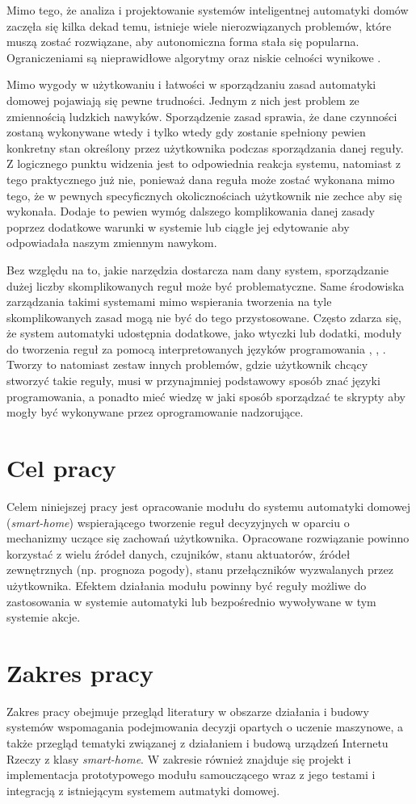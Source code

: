 Mimo tego, że analiza i projektowanie systemów inteligentnej automatyki domów zaczęła się kilka dekad temu, istnieje wiele nierozwiązanych problemów, które muszą zostać rozwiązane, aby autonomiczna forma stała się popularna. Ograniczeniami są nieprawidłowe algorytmy oraz niskie celności wynikowe \cite{episode_discovery_2}.

Mimo wygody w użytkowaniu i łatwości w sporządzaniu zasad automatyki domowej pojawiają się pewne trudności. Jednym z nich jest problem ze zmiennością ludzkich nawyków. Sporządzenie zasad sprawia, że dane czynności zostaną wykonywane wtedy i tylko wtedy gdy zostanie spełniony pewien konkretny stan określony przez użytkownika podczas sporządzania danej reguły. Z logicznego punktu widzenia jest to odpowiednia reakcja systemu, natomiast z tego praktycznego już nie, ponieważ dana reguła może zostać wykonana mimo tego, że w pewnych specyficznych okolicznościach użytkownik nie zechce aby się wykonała. Dodaje to pewien wymóg dalszego komplikowania danej zasady poprzez dodatkowe warunki w systemie lub ciągłe jej edytowanie aby odpowiadała naszym zmiennym nawykom.

Bez względu na to, jakie narzędzia dostarcza nam dany system, sporządzanie dużej liczby skomplikowanych reguł może być problematyczne. Same środowiska zarządzania takimi systemami mimo wspierania tworzenia na tyle skomplikowanych zasad mogą nie być do tego przystosowane. Często zdarza się, że system automatyki udostępnia dodatkowe, jako wtyczki lub dodatki, moduły do tworzenia reguł za pomocą interpretowanych języków programowania \cite{appdaemon:main}, \cite{domoticz:scripts}, \cite{openhab:scripts}. Tworzy to natomiast zestaw innych problemów, gdzie użytkownik chcący stworzyć takie reguły, musi w przynajmniej podstawowy sposób znać języki programowania, a ponadto mieć wiedzę w jaki sposób sporządzać te skrypty aby mogły być wykonywane przez oprogramowanie nadzorujące.


\section{Cel pracy}
Celem niniejszej pracy jest opracowanie modułu do systemu automatyki domowej (\textit{smart-home}) wspierającego tworzenie reguł decyzyjnych w oparciu o mechanizmy uczące się zachowań użytkownika. Opracowane rozwiązanie powinno korzystać z wielu źródeł danych, czujników, stanu aktuatorów, źródeł zewnętrznych (np. prognoza pogody), stanu przełączników wyzwalanych przez użytkownika. Efektem działania modułu powinny być reguły możliwe do zastosowania w systemie automatyki lub bezpośrednio wywoływane w tym systemie akcje.

\section{Zakres pracy}
Zakres pracy obejmuje przegląd literatury w obszarze działania i budowy systemów wspomagania podejmowania decyzji opartych o uczenie maszynowe, a także przegląd tematyki związanej z działaniem i budową urządzeń Internetu Rzeczy z klasy \textit{smart-home}. W zakresie również znajduje się projekt i implementacja prototypowego modułu samouczącego wraz z jego testami i integracją z istniejącym systemem autmatyki domowej.
